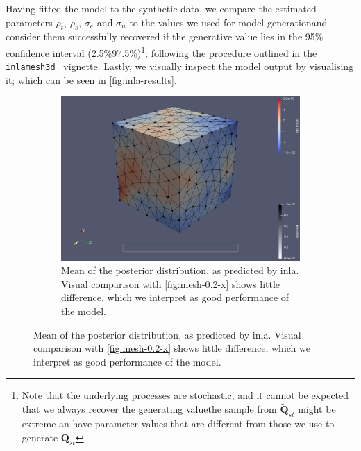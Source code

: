 \documentclass[british]{scrreprt}
\begin{document}
Having fitted the model to the synthetic data, we compare the estimated parameters \( \rho_{t} \), \( \rho_{s} \), \( \sigma_{e} \) and \( \sigma_{n} \) to the values we used for model generation\textemdash{}and consider them successfully recovered if the generative value lies in the 95\% confidence interval (2.5\%\textendash{}97.5\%)\footnote{Note that the underlying processes are stochastic, and it cannot be expected that we always recover the generating value\textemdash{}the sample from \( \symbf{\tilde{Q}}_{st} \) might be extreme an have parameter values that are different from those we use to generate \( \symbf{\tilde{Q}}_{st} \)}; following the procedure outlined in the \texttt{inlamesh3d}~\cite{Lindgreninlamesh3d2022} vignette. Lastly, we visually inspect the model output by visualising it; which can be seen in \cref{fig:inla-results}.
\begin{figure}
    \centering
    \begin{subfigure}{0.8\textwidth}
        \includegraphics{img/mesh_0.2_eta.png}
        \caption{Mean of the posterior distribution, as predicted by \gls{inla}. Visual comparison with \cref{fig:mesh-0.2-x} shows little difference, which we interpret as good performance of the model.}
        \label{fig:mesh-0.2-eta}
    \end{subfigure}
    

\end{figure}
\end{document}
